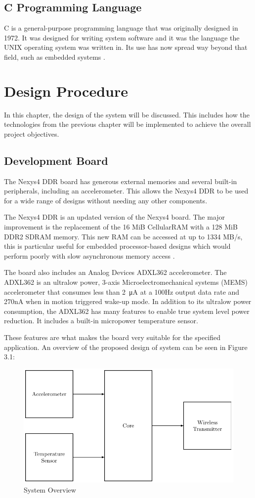\documentclass[12pt,a4paper]{report} %
\begin{document}
\section{C Programming Language}
C is a general-purpose programming language that was originally designed in 1972.
It was designed for writing system software and it was the language the UNIX operating system was written in.
Its use has now spread way beyond that field, such as embedded systems \cite{yuri}.
\chapter{Design Procedure}
In this chapter, the design of the system will be discussed.
This includes how the technologies from the previous chapter will be implemented to achieve the overall project objectives.
\section{Development Board}
The Nexys4 DDR board has generous external memories and several built-in peripherals, including an accelerometer.
This allows the Nexys4 DDR to be used for a wide range of designs without needing any other components.

The Nexys4 DDR is an updated version of the Nexys4 board. The major improvement is the replacement of the 16 MiB CellularRAM with a 128 MiB DDR2 SDRAM memory.
This new RAM can be accessed at up to 1334 MB/s, this is particular useful for embedded processor-based designs which would perform poorly with slow asynchronous memory access \cite{digvid}.

The board also includes an Analog Devices ADXL362 accelerometer.
The ADXL362 is an ultralow power, 3-axis Microelectromechanical systems (MEMS) accelerometer that consumes less than \SI{2}{\micro\ampere} at a 100Hz output data rate and 270nA when in motion triggered wake-up mode.
In addition to its ultralow power consumption, the ADXL362 has many features to enable true system level power reduction.
It includes a built-in micropower temperature sensor.

These features are what makes the board very suitable for the specified application.
An overview of the proposed design of system can be seen in Figure 3.1:
\begin{figure}[ht]
\centerline{\includegraphics[scale=0.8]{diagrams/System_Overview}}
\caption{System Overview}
\end{figure}
\end{document}
